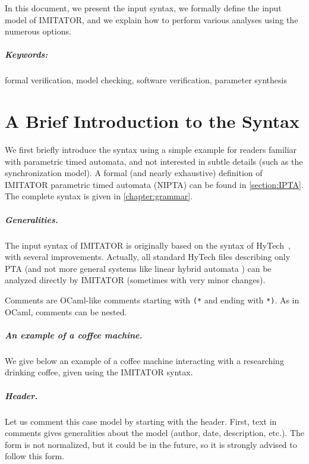 \documentclass[a4paper,11pt]{report}
\newcommand{\hytech}{{\sc HyTech}}
\newcommand{\imitator}{\textsf{IMITATOR}}
\newcommand{\NIPTA}{NIPTA}
\newcommand{\paragraphe}[1]{\paragraph{#1.}}
\newcommand{\styleIMI}[1]{\textcolor{imicolor}{\texttt{#1}}}
\newcommand{\IncludeIMIfile}[1]{
	\lstset{language=Imitator}
	
}
\begin{document}
In this document, we present the input syntax, we formally define the input model of \imitator{}, and we explain how to perform various analyses using the numerous options.


\paragraph{Keywords:} formal verification, model checking, software verification, parameter synthesis


\chapter{A Brief Introduction to the Syntax}

We first briefly introduce the syntax using a simple example for readers familiar with parametric timed automata, and not interested in subtle details (such as the synchronization model).
A formal (and nearly exhaustive) definition of \imitator{} parametric timed automata (\NIPTA{}) can be found in \cref{section:IPTA}.
The complete syntax is given in \cref{chapter:grammar}.

\paragraphe{Generalities}
The input syntax of \imitator{} is originally based on the syntax of \hytech{}~\cite{HHW95}, with several improvements.
Actually, all standard \hytech{} files describing only PTA (and not more general systems like linear hybrid automata \cite{achh92}) can be analyzed directly by \imitator{} (sometimes with very minor changes).

Comments are OCaml-like comments starting with \styleIMI{(*} and ending with \styleIMI{*)}.
As in OCaml, comments can be nested.


\paragraphe{An example of a coffee machine}
We give below an example of a coffee machine interacting with a researching drinking coffee, given using the \imitator{} syntax.

\IncludeIMIfile{../examples/Coffee/coffeeDrinker.imi}



\paragraphe{Header}
Let us comment this case model by starting with the header.
First, text in comments gives generalities about the model (author, date, description, etc.).
The form is not normalized, but it could be in the future, so it is strongly advised to follow this form.
\end{document}
